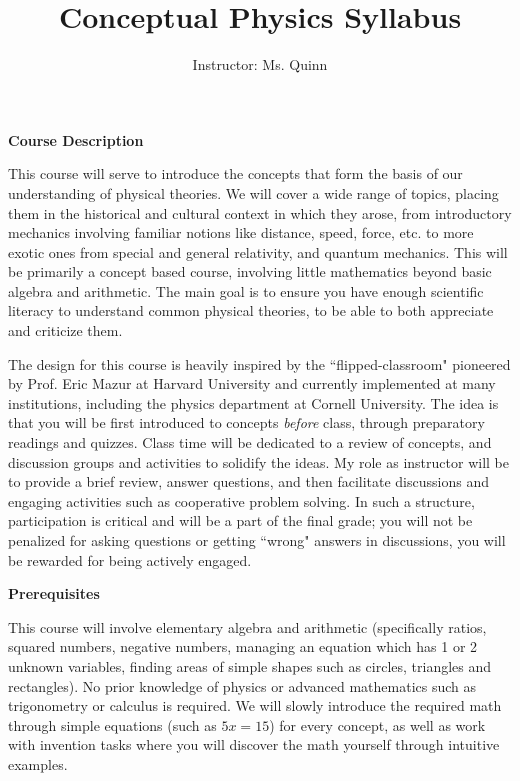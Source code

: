 \documentclass[12pt]{article}
\begin{document}
\title{Conceptual Physics Syllabus}

\author{Instructor: Ms. Quinn} 
	
\maketitle

\noindent \textbf{Course Description}

This course will serve to introduce the concepts that form the basis of our understanding of physical theories. We will cover a wide range of topics, placing them in the historical and cultural context in which they arose, from introductory mechanics involving familiar notions like distance, speed, force, etc. to more exotic ones from special and general relativity, and quantum mechanics. This will be primarily a concept based course, involving little mathematics beyond basic algebra and arithmetic. The main goal is to ensure you have enough scientific literacy to understand common physical theories, to be able to both appreciate and criticize them.

The design for this course is heavily inspired by the ``flipped-classroom" pioneered by Prof. Eric Mazur at Harvard University and currently implemented at many institutions, including the physics department at Cornell University. The idea is that you will be first introduced to concepts \textit{before} class, through preparatory readings and quizzes. Class time will be dedicated to a review of concepts, and discussion groups and activities to solidify the ideas. My role as instructor will be to provide a brief review, answer questions, and then facilitate discussions and engaging activities such as cooperative problem solving. In such a structure, participation is critical and will be a part of the final grade; you will not be penalized for asking questions or getting ``wrong" answers in discussions, you will be rewarded for being actively engaged.\newline

\noindent \textbf{Prerequisites}

This course will involve elementary algebra and arithmetic (specifically ratios, squared numbers, negative numbers, managing an equation which has 1 or 2 unknown variables, finding areas of simple shapes such as circles, triangles and rectangles). No prior knowledge of physics or advanced mathematics such as trigonometry or calculus is required. We will slowly introduce the required math through simple equations (such as $5x = 15$) for every concept, as well as work with invention tasks where you will discover the math yourself through intuitive examples.\newline
\end{document}
